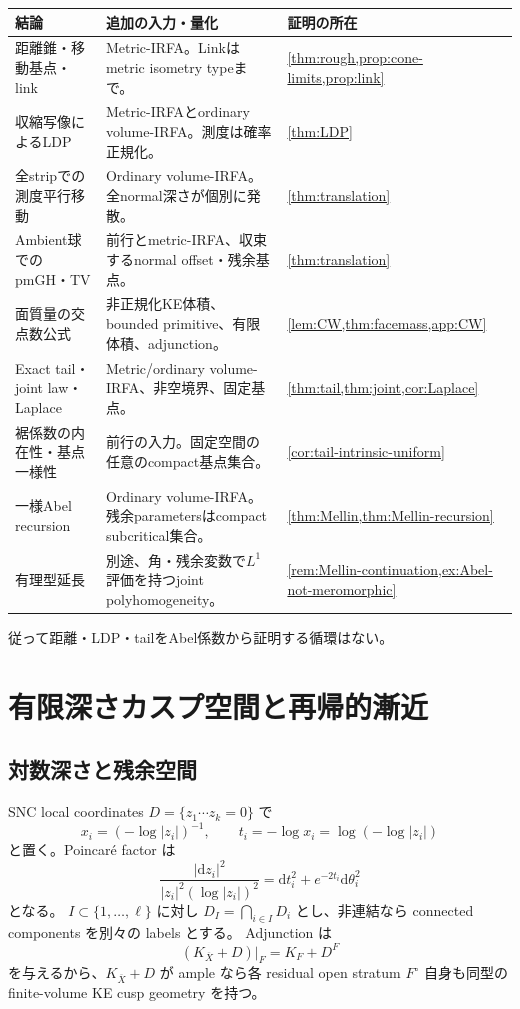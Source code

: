 \documentclass[11pt,a4paper]{ltjsarticle}
\newcommand{\dd}{\mathrm d}
\newcommand{\ov}{\overline}
\theoremstyle{plain}
\theoremstyle{definition}
\theoremstyle{remark}
\begin{document}
{\small
\setlength{\tabcolsep}{4pt}
\renewcommand{\arraystretch}{1.15}
\begin{longtable}{@{}p{}p{}p{}@{}}
\toprule
結論 & 追加の入力・量化 & 証明の所在\\
\midrule
\endhead
距離錐・移動基点・link & Metric-IRFA。Linkはmetric isometry typeまで。 &
\cref{thm:rough,prop:cone-limits,prop:link}\\
収縮写像によるLDP & Metric-IRFAとordinary volume-IRFA。測度は確率正規化。 &
\cref{thm:LDP}\\
全stripでの測度平行移動 & Ordinary volume-IRFA。全normal深さが個別に発散。 &
\cref{thm:translation}\\
Ambient球でのpmGH・TV & 前行とmetric-IRFA、収束するnormal offset・残余基点。 &
\cref{thm:translation}\\
面質量の交点数公式 & 非正規化KE体積、bounded primitive、有限体積、adjunction。 &
\cref{lem:CW,thm:facemass,app:CW}\\
Exact tail・joint law・Laplace & Metric/ordinary volume-IRFA、非空境界、固定基点。 &
\cref{thm:tail,thm:joint,cor:Laplace}\\
裾係数の内在性・基点一様性 & 前行の入力。固定空間の任意のcompact基点集合。 &
\cref{cor:tail-intrinsic-uniform}\\
一様Abel recursion & Ordinary volume-IRFA。残余parametersはcompact subcritical集合。 &
\cref{thm:Mellin,thm:Mellin-recursion}\\
有理型延長 & 別途、角・残余変数で$L^1$評価を持つjoint polyhomogeneity。 &
\cref{rem:Mellin-continuation,ex:Abel-not-meromorphic}\\
\bottomrule
\end{longtable}
}
従って距離・LDP・tailをAbel係数から証明する循環はない。

\section{有限深さカスプ空間と再帰的漸近}
\label{sec:IRFA}

\subsection{対数深さと残余空間}
SNC local coordinates $D=\{z_1\cdots z_k=0\}$ で
\[
 x_i=(-\log|z_i|)^{-1},\qquad t_i=-\log x_i=\log(-\log|z_i|)
\]
と置く。Poincar\'e factor は
\[
 \frac{|\dd z_i|^2}{|z_i|^2(\log|z_i|)^2}
 =\dd t_i^2+e^{-2t_i}\dd\theta_i^2
\]
となる。
$I\subset\{1,\ldots,\ell\}$ に対し $D_I=\bigcap_{i\in I}D_i$ とし、非連結なら connected components を別々の labels とする。
Adjunction は
\[
 (K_{\ov X}+D)|_F=K_F+D^F
\]
を与えるから、$K_{\ov X}+D$ が ample なら各 residual open stratum $F^\circ$ 自身も同型の finite-volume KE cusp geometry を持つ。
\end{document}
